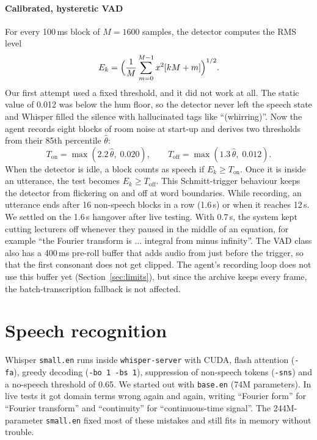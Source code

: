 \documentclass[11pt,a4paper,oneside]{report}
\theoremstyle{definition}
\newcommand{\code}[1]{\texttt{\small #1}}
\begin{document}
\paragraph{Calibrated, hysteretic VAD} For every 100\,ms block of $M = 1600$ samples, the detector computes the RMS level
\begin{equation}
  E_k = \Bigl(\frac{1}{M}\sum_{m=0}^{M-1} x^2[kM+m]\Bigr)^{1/2}.
\end{equation}
Our first attempt used a fixed threshold, and it did not work at all. The static value of 0.012 was below the hum floor, so the detector never left the speech state and Whisper filled the silence with hallucinated tags like ``(whirring)''. Now the agent records eight blocks of room noise at start-up and derives two thresholds from their 85th percentile $\hat\theta$:
\begin{equation}
  T_{\text{on}} = \max(2.2\,\hat\theta,\; 0.020), \qquad T_{\text{off}} = \max(1.3\,\hat\theta,\; 0.012).
  \label{eq:vad}
\end{equation}
When the detector is idle, a block counts as speech if $E_k \ge T_{\text{on}}$. Once it is inside an utterance, the test becomes $E_k \ge T_{\text{off}}$. This Schmitt-trigger behaviour keeps the detector from flickering on and off at word boundaries. While recording, an utterance ends after 16 non-speech blocks in a row (1.6\,s) or when it reaches 12\,s. We settled on the 1.6\,s hangover after live testing. With 0.7\,s, the system kept cutting lecturers off whenever they paused in the middle of an equation, for example ``the Fourier transform is $\ldots$ integral from minus infinity''. The VAD class also has a 400\,ms pre-roll buffer that adds audio from just before the trigger, so that the first consonant does not get clipped. The agent's recording loop does not use this buffer yet (Section~\ref{sec:limits}), but since the archive keeps every frame, the batch-transcription fallback is not affected.

\section{Speech recognition}
\label{sec:asr}
Whisper \texttt{small.en} runs inside \texttt{whisper-server} with CUDA, flash attention (\code{-fa}), greedy decoding (\code{-bo 1 -bs 1}), suppression of non-speech tokens (\code{-sns}) and a no-speech threshold of 0.65. We started out with \texttt{base.en} (74M parameters). In live tests it got domain terms wrong again and again, writing ``Fourier form'' for ``Fourier transform'' and ``continuity'' for ``continuous-time signal''. The 244M-parameter \texttt{small.en} fixed most of these mistakes and still fits in memory without trouble.
\end{document}
